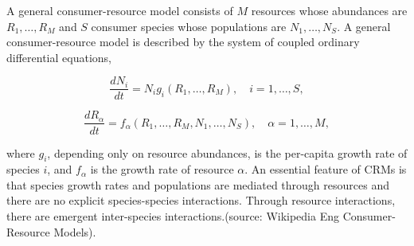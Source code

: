 A general consumer-resource model consists of \( M \) resources whose abundances are \( R_1, \ldots, R_M \) and \( S \) consumer species whose populations are \( N_1, \ldots, N_S \). A general consumer-resource model is described by the system of coupled ordinary differential equations,

\[
\frac{dN_i}{dt} = N_i g_i(R_1, \ldots, R_M), \quad i = 1, \ldots, S,
\]

\[
\frac{dR_\alpha}{dt} = f_\alpha(R_1, \ldots, R_M, N_1, \ldots, N_S), \quad \alpha = 1, \ldots, M,
\]

where \( g_i \), depending only on resource abundances, is the per-capita growth rate of species \( i \), and \( f_\alpha \) is the growth rate of resource \( \alpha \). An essential feature of CRMs is that species growth rates and populations are mediated through resources and there are no explicit species-species interactions. Through resource interactions, there are emergent inter-species interactions.(source: Wikipedia Eng Consumer-Resource Models).




